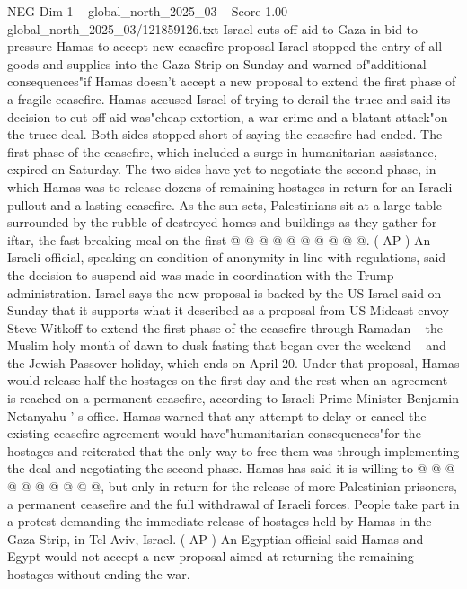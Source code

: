 \begin{textsample}{NEG Dim 1 – global\_north\_2025\_03 – Score 1.00 – global\_north\_2025\_03/121859126.txt}  \label{ex:f1_neg_036}
Israel cuts off aid to Gaza in bid to pressure Hamas to accept new ceasefire proposal Israel stopped the entry of all goods and supplies into the Gaza Strip on Sunday and warned of"additional consequences"if Hamas doesn't accept a new proposal to extend the first phase of a fragile ceasefire.
Hamas accused Israel of trying to derail the truce and said its decision to cut off aid was"cheap extortion, a war crime and a blatant attack"on the truce deal.
Both sides stopped short of saying the ceasefire had ended.
The first phase of the ceasefire, which included a surge in humanitarian assistance, expired on Saturday.
The two sides have yet to negotiate the second phase, in which Hamas was to release dozens of remaining hostages in return for an Israeli pullout and a lasting ceasefire.
As the sun sets, Palestinians sit at a large table surrounded by the rubble of destroyed homes and buildings as they gather for iftar, the fast-breaking meal on the first @ @ @ @ @ @ @ @ @ @. ( AP ) An Israeli official, speaking on condition of anonymity in line with regulations, said the decision to suspend aid was made in coordination with the Trump administration.
Israel says the new proposal is backed by the US Israel said on Sunday that it supports what it described as a proposal from US Mideast envoy Steve Witkoff to extend the first phase of the ceasefire through Ramadan -- the Muslim holy month of dawn-to-dusk fasting that began over the weekend -- and the Jewish Passover holiday, which ends on April 20.
Under that proposal, Hamas would release half the hostages on the first day and the rest when an agreement is reached on a permanent ceasefire, according to Israeli Prime Minister Benjamin Netanyahu ' s office.
Hamas warned that any attempt to delay or cancel the existing ceasefire agreement would have"humanitarian consequences"for the hostages and reiterated that the only way to free them was through implementing the deal and negotiating the second phase.
Hamas has said it is willing to @ @ @ @ @ @ @ @ @ @, but only in return for the release of more Palestinian prisoners, a permanent ceasefire and the full withdrawal of Israeli forces.
People take part in a protest demanding the immediate release of hostages held by Hamas in the Gaza Strip, in Tel Aviv, Israel. ( AP ) An Egyptian official said Hamas and Egypt would not accept a new proposal aimed at returning the remaining hostages without ending the war.

\end{textsample}
